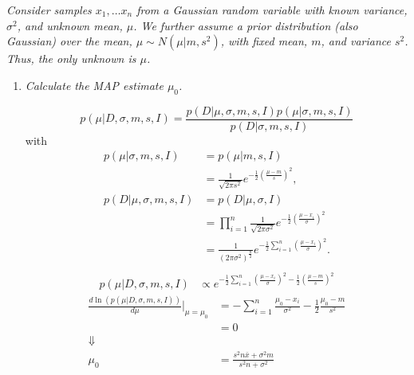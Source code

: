 \begin{example}
	\emph{Consider samples $x_1,\dots x_n$ from a Gaussian random variable with known variance, $\sigma^2$, and unknown mean, $\mu$. We further assume a prior distribution (also Gaussian) over the mean, $\mu\sim N(\mu|m,s^2)$, with fixed mean, $m$, and variance $s^2$. Thus, the only unknown is $\mu$.}
	
	\begin{enumerate}
		\item \emph{Calculate the MAP estimate $\mu_0$.}
		
		\begin{equation}
			p(\mu|D,\sigma,m,s,I)=\frac{p(D|\mu,\sigma,m,s,I)p(\mu|\sigma,m,s,I)}{p(D|\sigma,m,s,I)}
		\end{equation}
		with
		\begin{equation}
			\begin{split}
				p(\mu|\sigma,m,s,I) &= p(\mu|m,s,I)\\
				&= \frac{1}{\sqrt{2\pi s^2}}e^{-\frac{1}{2}(\frac{\mu-m}{s})^2},\\
				p(D|\mu,\sigma,m,s,I) &= p(D|\mu,\sigma,I)\\
				&= \prod_{i=1}^{n}\frac{1}{\sqrt{2\pi \sigma^2}}e^{-\frac{1}{2}(\frac{\mu-x_i}{\sigma})^2}\\
				&= \frac{1}{(2\pi \sigma^2)^{\frac{n}{2}}}e^{-\frac{1}{2}\sum_{i=1}^n(\frac{\mu-x_i}{\sigma})^2}.\\
			\end{split}
		\end{equation}
		\begin{equation}
			\begin{split}
				p(\mu|D,\sigma,m,s,I) &\propto e^{-\frac{1}{2}\sum_{i=1}^n(\frac{\mu-x_i}{\sigma})^2-\frac{1}{2}(\frac{\mu-m}{s})^2}
			\end{split}
		\end{equation}
		\begin{equation}
			\begin{split}
				\frac{d\ln(p(\mu|D,\sigma,m,s,I))}{d\mu}\bigg|_{\mu=\mu_0} & = -\sum_{i=1}^n\frac{\mu_0-x_i}{\sigma^2}-\frac{1}{2}\frac{\mu_0-m}{s^2}\\
				&=0\\
				\Downarrow\\
				\mu_0 & = \frac{s^2n\bar{x}+\sigma^2m}{s^2n+\sigma^2}
			\end{split}
		\end{equation}
		

\end{enumerate}
\end{example}
